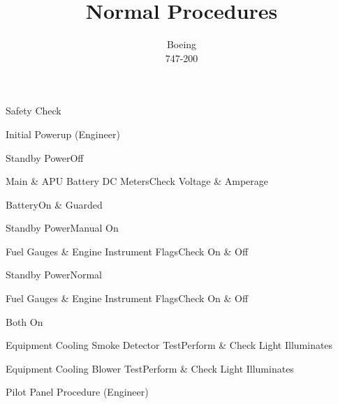 \documentclass[sim-use, blue_items]{checklist}
\title{Normal Procedures}
\subtitle{Boeing \\ 747-200}
\begin{document}
\begin{checklist}{Safety Check}
\end{checklist}

\begin{checklist}{Initial Powerup (Engineer)}
	 {
		\item{Standby Power}{Off}
		\item{Main \& APU Battery DC Meters}{Check Voltage \& Amperage}
		\item{Battery}{On \& Guarded} 
	}
	 {
		\item{Standby Power}{Manual On}
		\item{Fuel Gauges \& Engine Instrument Flags}{Check On \& Off}
		\item{Standby Power}{Normal}
		\item{Fuel Gauges \& Engine Instrument Flags}{Check On \& Off}
	}
	 {Both On}
	 {
		\item{Equipment Cooling Smoke Detector Test}{Perform \& Check Light Illuminates}
		\item{Equipment Cooling Blower Test}{Perform \& Check Light Illuminates}
	}
\end{checklist}

\begin{checklist}{Pilot Panel Procedure (Engineer)}
\end{checklist}
\end{document}
